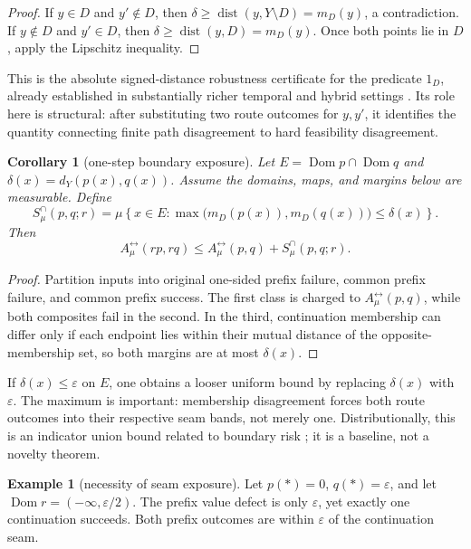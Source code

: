 \documentclass[11pt]{article}
\newtheorem{corollary}[theorem]{Corollary}
\theoremstyle{definition}
\newtheorem{example}[theorem]{Example}
\theoremstyle{remark}
\newcommand{\Dom}{\operatorname{Dom}}
\newcommand{\dist}{\operatorname{dist}}
\begin{document}
\begin{proof}
If \(y\in D\) and \(y'\notin D\), then
\(\delta\ge\dist(y,Y\setminus D)=m_D(y)\), a contradiction. If
\(y\notin D\) and \(y'\in D\), then
\(\delta\ge\dist(y,D)=m_D(y)\). Once both points lie in \(D\), apply the
Lipschitz inequality.
\end{proof}

This is the absolute signed-distance robustness certificate for the predicate
\(1_D\), already established in substantially richer temporal and hybrid
settings \citep{fainekos2009}. Its role here is structural: after substituting
two route outcomes for \(y,y'\), it identifies the quantity connecting finite
path disagreement to hard feasibility disagreement.

\begin{corollary}[one-step boundary exposure]
\label{cor:seam}
Let \(E=\Dom p\cap\Dom q\) and
\(\delta(x)=d_Y(p(x),q(x))\). Assume the domains, maps, and margins below are
measurable. Define
\[
S_\mu^\cap(p,q;r)=
\mu\left\{x\in E:
\max\bigl(m_D(p(x)),m_D(q(x))\bigr)\le\delta(x)\right\}.
\]
Then
\[
A_\mu^{\leftrightarrow}(rp,rq)
\le A_\mu^{\leftrightarrow}(p,q)+S_\mu^\cap(p,q;r).
\]
\end{corollary}

\begin{proof}
Partition inputs into original one-sided prefix failure, common prefix
failure, and common prefix success. The first class is charged to
\(A_\mu^{\leftrightarrow}(p,q)\), while both composites fail in the second.
In the third, continuation membership can differ only if each endpoint lies
within their mutual distance of the opposite-membership set, so both margins
are at most \(\delta(x)\).
\end{proof}

If \(\delta(x)\le\varepsilon\) on \(E\), one obtains a looser uniform bound by
replacing \(\delta(x)\) with \(\varepsilon\). The maximum is important:
membership disagreement forces both route outcomes into their respective
seam bands, not merely one. Distributionally, this is an indicator union
bound related to boundary risk \citep{zhang2019trades}; it is a baseline, not
a novelty theorem.

\begin{example}[necessity of seam exposure]
Let \(p(\ast)=0\), \(q(\ast)=\varepsilon\), and let
\(\Dom r=(-\infty,\varepsilon/2)\). The prefix value defect is only
\(\varepsilon\), yet exactly one continuation succeeds. Both prefix outcomes
are within \(\varepsilon\) of the continuation seam.
\end{example}
\end{document}
